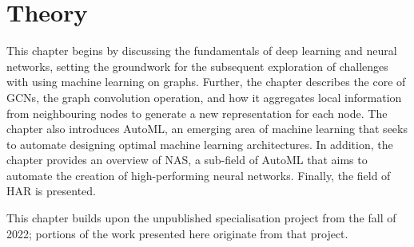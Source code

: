 \chapter{Theory}

This chapter begins by discussing the fundamentals of deep learning and neural networks, setting the groundwork for the subsequent exploration of challenges with using machine learning on graphs. Further, the chapter describes the core of \glspl{GCN}, the graph convolution operation, and how it aggregates local information from neighbouring nodes to generate a new representation for each node. The chapter also introduces \Gls{AutoML}, an emerging area of machine learning that seeks to automate designing optimal machine learning architectures. In addition, the chapter provides an overview of \gls{NAS}, a sub-field of \gls{AutoML} that aims to automate the creation of high-performing neural networks. Finally, the field of HAR is presented. 

This chapter builds upon the unpublished specialisation project from the fall of 2022; portions of the work presented here originate from that project.





 

